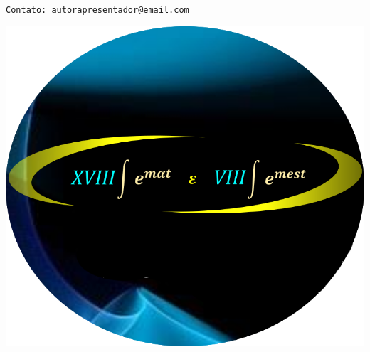 \documentclass[a0,portrait]{a0poster}
\begin{document}
\begin{minipage}[c]{\linewidth}
{\begin{minipage}[c]{0.70\textwidth}
\small \texttt{Contato: autorapresentador@email.com}\\
\end{minipage}
\begin{minipage}[c]{0.17\textwidth}
\vspace{0pt}\raggedleft
\includegraphics[scale=0.33]{fundologo}
\hspace{1cm}
\end{minipage}}
\\[0.1cm]%
\color{sematcolor}\setlength\FrameRule{25pt}
\begin{framed}
\vspace{0.5cm}
\begin{multicols}{2} %







\color{Black}

\end{multicols}
\end{framed}
\end{minipage}
\end{document}
